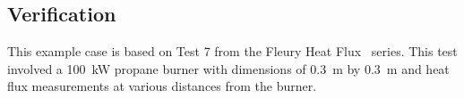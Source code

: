 \subsection*{Verification}

This example case is based on Test 7 from the Fleury Heat Flux~\cite{Fleury:Masters} series. This test involved a \SI{100}{kW} propane burner with dimensions of 0.3~m by 0.3~m and heat flux measurements at various distances from the burner.



